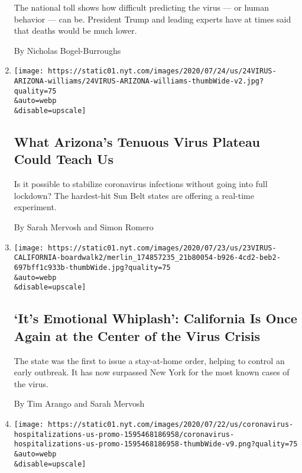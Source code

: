 \begin{enumerate}
  The national toll shows how difficult predicting the virus --- or
  human behavior --- can be. President Trump and leading experts have at
  times said that deaths would be much lower.

  By Nicholas Bogel-Burroughs
\item
  \href{/2020/07/24/us/coronavirus-arizona.html}{}

  \texttt{[image: https://static01.nyt.com/images/2020/07/24/us/24VIRUS-ARIZONA-williams/24VIRUS-ARIZONA-williams-thumbWide-v2.jpg?quality=75\\\&auto=webp\\\&disable=upscale]}

  \hypertarget{what-arizonas-tenuous-virus-plateau-could-teach-us}{%
  \subsection{What Arizona's Tenuous Virus Plateau Could Teach
  Us}\label{what-arizonas-tenuous-virus-plateau-could-teach-us}}

  Is it possible to stabilize coronavirus infections without going into
  full lockdown? The hardest-hit Sun Belt states are offering a
  real-time experiment.

  By Sarah Mervosh and Simon Romero
\item
  \href{/2020/07/23/us/california-covid-19-cases.html}{}

  \texttt{[image: https://static01.nyt.com/images/2020/07/23/us/23VIRUS-CALIFORNIA-boardwalk2/merlin\_174857235\_21b80054-b926-4cd2-beb2-697bff1c933b-thumbWide.jpg?quality=75\\\&auto=webp\\\&disable=upscale]}

  \hypertarget{its-emotional-whiplash-california-is-once-again-at-the-center-of-the-virus-crisis}{%
  \subsection{`It's Emotional Whiplash': California Is Once Again at the
  Center of the Virus
  Crisis}\label{its-emotional-whiplash-california-is-once-again-at-the-center-of-the-virus-crisis}}

  The state was the first to issue a stay-at-home order, helping to
  control an early outbreak. It has now surpassed New York for the most
  known cases of the virus.

  By Tim Arango and Sarah Mervosh
\item
  \href{/interactive/2020/07/23/us/coronavirus-hospitalizations-us.html}{}

  \texttt{[image: https://static01.nyt.com/images/2020/07/22/us/coronavirus-hospitalizations-us-promo-1595468186958/coronavirus-hospitalizations-us-promo-1595468186958-thumbWide-v9.png?quality=75\\\&auto=webp\\\&disable=upscale]}


\end{enumerate}
